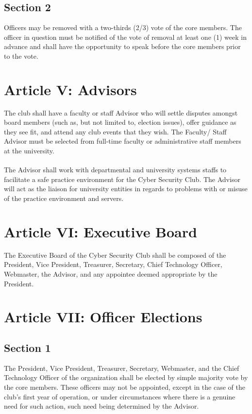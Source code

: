 \documentclass[10pt]{article}
\begin{document}
\subsection*{Section 2}
Officers may be removed with a two-thirds (2/3) vote of the core members. The officer in question
must be notified of the vote of removal at least one (1) week in advance and shall have the opportunity
to speak before the core members prior to the vote.
\vspace{0.2in}

\section*{Article V: Advisors}
The club shall have a faculty or staff Advisor who will settle disputes amongst board members (such as,
but not limited to, election issues), offer guidance as they see fit, and attend any club events that they
wish. The Faculty/ Staff Advisor must be selected from full-time faculty or administrative staff
members at the university.\\\\
The Advisor shall work with departmental and university systems staffs to facilitate a safe practice
environment for the Cyber Security Club. The Advisor will act as the liaison for university entities in
regards to problems with or misuse of the practice environment and servers.
\vspace{0.2in}

\section*{Article VI: Executive Board}
The Executive Board of the Cyber Security Club shall be composed of the President, Vice President,
Treasurer, Secretary, Chief Technology Officer, Webmaster, the Advisor, and any appointee deemed appropriate by
the President.
\vspace{0.2in}

\section*{Article VII: Officer Elections}
\subsection*{Section 1}
The President, Vice President, Treasurer, Secretary, Webmaster, and the Chief Technology Officer of the
organization shall be elected by simple majority vote by the core members. These officers may not be
appointed, except in the case of the club's first year of operation, or under circumstances where there is
a genuine need for such action, such need being determined by the Advisor.
\end{document}
